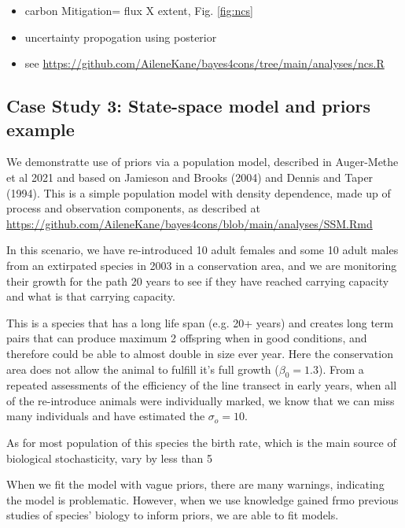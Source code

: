 \documentclass{article}
\begin{document}
\begin{itemize}
\item carbon Mitigation= flux X extent, Fig. \ref{fig:ncs}
\item uncertainty propogation using posterior
\item see \href{https://github.com/AileneKane/bayes4cons/tree/main/analyses/ncs.R}{https://github.com/AileneKane/bayes4cons/tree/main/analyses/ncs.R}
\end{itemize}

\subsection*{Case Study 3: State-space model and priors example}

\par We demonstratte use of priors via a population model, described in Auger-Methe et al 2021 and based on Jamieson and Brooks (2004) and Dennis and Taper (1994). This is a simple population model with density dependence, made up of process and observation components, as described at \href{https://github.com/AileneKane/bayes4cons/blob/main/analyses/SSM.Rmd}{https://github.com/AileneKane/bayes4cons/blob/main/analyses/SSM.Rmd}

\par In this scenario, we have re-introduced 10 adult females and some 10 adult males from an extirpated species in 2003 in a conservation area, and we are monitoring their growth for the path 20 years to see if they have reached carrying capacity and what is that carrying capacity.

\par This is a species that has a long life span (e.g. 20+ years) and creates long term pairs  that can produce maximum 2 offspring when in good conditions, and therefore could be able to almost double in size ever year. Here the conservation area does not allow the animal to fulfill it's full growth ($\beta_0 = 1.3$). From a repeated assessments of the efficiency of the line transect in early years, when all of the re-introduce animals were individually marked, we know that we can miss many individuals and have estimated the $\sigma_o = 10$.

\par As for most population of this species the birth rate, which is the main source of biological stochasticity, vary by less than 5%

\par When we fit the model with vague priors, there are many warnings, indicating the model is problematic. However, when we use knowledge gained frmo previous studies of species' biology to inform priors, we are able to fit models.
\end{document}
